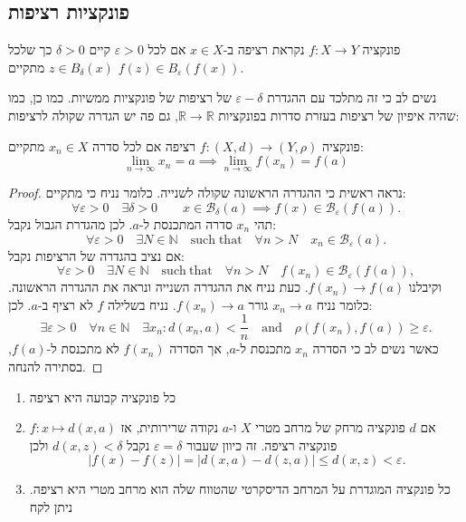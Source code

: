 \documentclass{tstextbook}
\begin{document}
\subsection{פונקציות רציפות}

\begin{definition}[רציפות]
פונקציה \(f:X\to Y\) נקראת רציפה ב-\(x \in X\) אם לכל \(\varepsilon>0\) קיים \(\delta>0\) כך שלכל \(z\in B_{\delta}(x)\) מתקיים \(f(z)\in B_{\varepsilon}(f(x))\).

\end{definition}
נשים לב כי זה מתלכד עם ההגדרת \(\varepsilon-\delta\) של רציפות של פונקציות ממשיות. כמו כן, כמו שהיה איפיון של רציפות בעזרת סדרות בפונקציות \(\mathbb{R}\to\mathbb{R}\), גם פה יש הגדרה שקולה לרציפות:

\begin{proposition}
פונקציה \(f:(X,d)\to\left( Y,\rho \right)\) רציפה אם לכל סדרה \(x_{n}\in X\) מתקיים:
$$\operatorname*{lim}_{n\to\infty}x_{n}=a\implies\operatorname*{lim}_{n\to\infty}f(x_{n})=f(a)$$

\end{proposition}
\begin{proof}
נראה ראשית כי ההגדרה הראשונה שקולה לשנייה. כלומר נניח כי מתקיים:
$$\forall\varepsilon>0\quad\exists\delta>0\qquad x\in{\mathcal{B}}_{\delta}(a)\implies f(x)\in{\mathcal{B}}_{\varepsilon}(f(a)).$$
תהי \(x_{n}\) סדרה המתכנסת ל-\(a\). לכן מהגדרת הגבול נקבל:
$$\forall\varepsilon>0\quad\exists N\in\mathbb{N}\quad\mathrm{such\;that}\quad\forall n>N\quad x_{n}\in\mathcal{B}_{\varepsilon}(a).$$
אם נציב בהגדרה של הרציפות נקבל:
$$\forall\varepsilon>0\quad\exists N\in\mathbb{N}\quad{\mathrm{such~that}}\quad\forall n>N\quad f(x_{n})\in{\mathcal{B}}_{\varepsilon}(f(a)),$$
וקיבלנו \(f(x_{n})\to f(a)\). כעת נניח את ההגדרה השנייה ונראה את ההגדרה הראשונה. כלומר נניח \(x_{n}\to a\) גורר \(f(x_{n})\to a\). נניח בשלילה \(f\) לא רציף ב-\(a\). לכן:
$$\exists\varepsilon>0\quad\forall n\in\mathbb{N}\quad\exists x_{n}:d(x_{n},a)<{\frac{1}{n}}\quad\mathrm{and}\quad\rho(f(x_{n}),f(a))\geq\varepsilon.$$
כאשר נשים לב כי הסדרה \(x_{n}\) מתכנסת ל-\(a\), אך הסדרה \(f(x_{n})\) לא מתכנסת ל-\(f(a)\), בסתירה להנחה.

\end{proof}
\begin{example}
  \begin{enumerate}
    \item כל פונקציה קבועה היא רציפה 


    \item אם \(d\) פונקציה מרחק של מרחב מטרי \(X\) ו-\(a\) נקודה שרירותית, אז \(f:x\mapsto d(x,a)\) פונקציה רציפה. זה כיוון שעבור \(\varepsilon=\delta\) נקבל \(d(x,z)<\delta\) ולכן\\
$$\left|f(x)-f(z)\right|=\left|d(x,a)-d(z,a)\right|\leq d(x,z)<\varepsilon.$$


    \item כל פונקציה המוגדרת על המרחב הדיסקרטי שהטווח שלה הוא מרחב מטרי היא רציפה. ניתן לקח 


  \end{enumerate}
\end{example}
\end{document}
